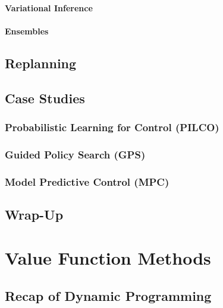 			\subsubsection{Variational Inference} %

			\subsubsection{Ensembles} %

	\section{Replanning} %

	\section{Case Studies} %

		\subsection{Probabilistic Learning for Control (PILCO)} %

		\subsection{Guided Policy Search (GPS)} %

		\subsection{Model Predictive Control (MPC)} %

	\section{Wrap-Up} %

\chapter{Value Function Methods} %

	\section{Recap of Dynamic Programming} %

